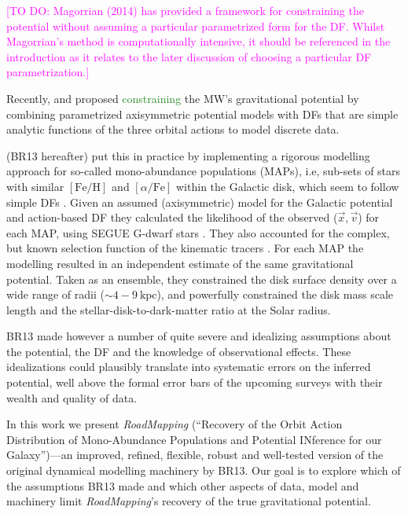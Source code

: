 \documentclass[iop,revtex4]{emulateapj}
\newcommand{\MAP}{MAP}
\newcommand{\MAPs}{MAPs}
\newcommand{\RM}{{\sl RoadMapping}}
\newcommand{\NEW}[1]{\textcolor{ForestGreen}{#1}}
\newcommand{\Wilma}[1]{\textcolor{Magenta}{#1}}
\newcommand{\OLD}[1]{}
\begin{document}
\Wilma{[TO DO: Magorrian (2014) has provided a framework for constraining the potential without assuming a particular parametrized form for the DF. Whilst Magorrian's method is computationally intensive, it should be referenced in the introduction as it relates to the later discussion of choosing a particular DF parametrization.]}

Recently, \citet{2012MNRAS.426.1328B} and \citet{2013ApJ...779..115B} proposed \OLD{to constrain}\NEW{constraining} the MW's gravitational potential by combining parametrized axisymmetric potential models with DFs that are simple analytic functions of the three orbital actions to model discrete data.

\citet{2013ApJ...779..115B} (BR13 hereafter) put this in practice by implementing a rigorous modelling approach for so-called mono-abundance populations (\MAPs{}), i.e, sub-sets of stars with similar $[\mathrm{Fe}/\mathrm{H}]$ and $[\alpha/\mathrm{Fe}]$ within the Galactic disk, which seem to follow simple DFs \citep{2012ApJ...751..131B,2012ApJ...755..115B,2012ApJ...753..148B}. Given an assumed (axisymmetric) model for the Galactic potential and action-based DF \citep{2010MNRAS.401.2318B,2011MNRAS.413.1889B,2013MNRAS.434..652T} they calculated the likelihood of the observed ($\vec{x},\vec{v}$) for each \MAP{}, using SEGUE G-dwarf stars \citep{2009AJ....137.4377Y}. They also accounted for the complex, but known selection function of the kinematic tracers \citep{2012ApJ...753..148B}. For each \MAP{} the modelling resulted in an independent estimate of the same gravitational potential. Taken as an ensemble, they constrained the disk surface density over a wide range of radii ($\sim 4-9~\text{kpc}$), and powerfully constrained the disk mass scale length and the stellar-disk-to-dark-matter ratio at the Solar radius. 

BR13 made however a number of quite severe and idealizing assumptions about the potential, the DF and the knowledge of observational effects. These idealizations could plausibly translate into systematic errors on the inferred potential, well above the formal error bars of the upcoming surveys with their wealth and quality of data.

In this work we present \RM{} (``\textsc{R}ecovery of the \textsc{O}rbit \textsc{A}ction \textsc{D}istribution of \textsc{M}ono-\textsc{A}bundance \textsc{P}opulations and \textsc{P}otential \textsc{IN}ference for our \textsc{G}alaxy'')---an improved, refined, flexible, robust and well-tested version of the original dynamical modelling machinery by BR13. Our goal is to explore which of the assumptions BR13 made and which other aspects of data, model and machinery limit \RM{}'s recovery of the true gravitational potential.
\end{document}
